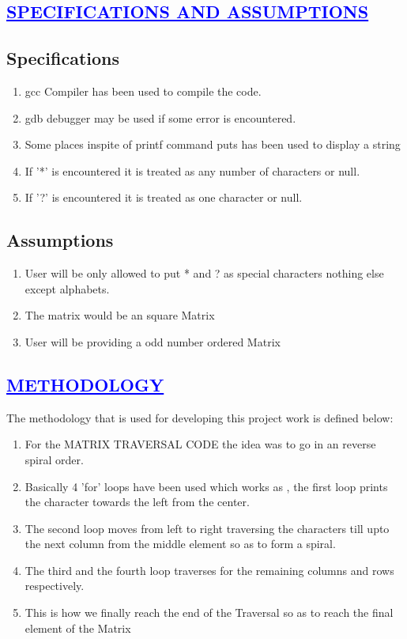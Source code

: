 \documentclass[a4paper,12pt]{report}
\begin{document}
\begin{center}
\chapter{\textcolor{blue}{\underline {SPECIFICATIONS AND ASSUMPTIONS}}}
\end{center}
\section*{Specifications}
\begin{enumerate}
\item gcc Compiler has been used to compile the code. 
\item gdb debugger may be used if some error is encountered.
\item Some places inspite of printf command puts has been used to display a string
\item If '*' is encountered it is treated as any number of characters or null.
\item If '?' is encountered it is treated as one character or null.


 \end{enumerate}
\section*{Assumptions}
\begin{enumerate}

\item User will be only allowed to put * and ? as special characters nothing else except alphabets.
\item The matrix would be an square Matrix
\item User will be providing a odd number ordered Matrix
\end{enumerate}
 
\begin{center}
\chapter{\textcolor{blue}{\underline {METHODOLOGY}}}
\end{center}
The methodology that is used for developing this project work is defined below:
\begin{enumerate} 
\item For the MATRIX TRAVERSAL CODE the idea was to go in an reverse spiral order.
\item Basically 4 'for' loops have been used which works as , the first loop prints the character towards the left from the center.
\item The second loop moves from left to right traversing the characters till upto the next column from the middle element so as to form a spiral.
\item The third and the fourth loop traverses for the remaining columns and rows respectively.
\item This is how we finally reach the end of the Traversal so as to reach the final element of the Matrix\\
\end{enumerate}
\end{document}

